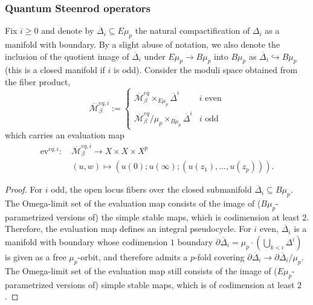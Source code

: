 \documentclass[reqno]{amsart}
\numberwithin{equation}{section}
\numberwithin{equation}{section}
\numberwithin{equation}{section}
\newtheorem{lemma}[thm]{Lemma}
\theoremstyle{definition}
\theoremstyle{remark}
\theoremstyle{remark}
\newcommand{\ov}{\overline}
\begin{document}
\subsubsection{Quantum Steenrod operators}\label{sssec:quantum-Steenrod-definition}
Fix $i \ge 0$ and denote by $\ov{\Delta}_i \subseteq E\mu_p$ the natural compactification of $\Delta_i$ as a manifold with boundary. By a slight abuse of notation, we also denote the inclusion of the quotient image of $\ov{\Delta}_i$ under $E\mu_p \to B \mu_p$ into $B\mu_p$ as $\ov{\Delta}_i \hookrightarrow B\mu_p$ (this is a closed manifold if $i$ is odd). Consider the moduli space obtained from the fiber product,
\begin{equation}
    \ov{\mathcal{M}}_\beta^{eq, i} := \begin{cases} \ov{\mathcal{M}}_\beta^{eq} \times_{E\mu_p} \ov{\Delta}^i & i \mbox{ even} \\ \ov{\mathcal{M}}_\beta^{eq}/\mu_p \times_{B\mu_p} \ov{\Delta}^i & i \mbox{ odd} \end{cases}
\end{equation}
which carries an evaluation map
\begin{align}
    \mathrm{ev}^{eq, i}: \  &\ov{\mathcal{M}}^{eq, i}_\beta \to X \times X \times X^p  \\
    &(u,w) \mapsto (u(0) ; u(\infty);  (u(z_1), \dots, u(z_p)) ).
\end{align}

\begin{proof}
    For $i$ odd, the open locus fibers over the closed submanifold $\ov{\Delta}_i \subseteq B\mu_p$. The Omega-limit set of the evaluation map consists of the image of ($B\mu_p$-parametrized versions of) the simple stable maps, which is codimension at least $2$. Therefore, the evaluation map defines an integral pseudocycle. For $i$ even, $\ov{\Delta}_i$ is a manifold with boundary whose codimension $1$ boundary $\partial \ov{\Delta}_i = \mu_p \cdot \left( \bigcup_{k < i} \Delta^i \right)$ is given as a free $\mu_p$-orbit, and therefore admits a $p$-fold covering $\partial \ov{\Delta}_i \to \partial \ov{\Delta}_i /\mu_p$. The Omega-limit set of the evaluation map still consists of the image of ($E\mu_p$-parametrized versions of) simple stable maps, which is of codimension at least $2$.
\end{proof}
\end{document}
